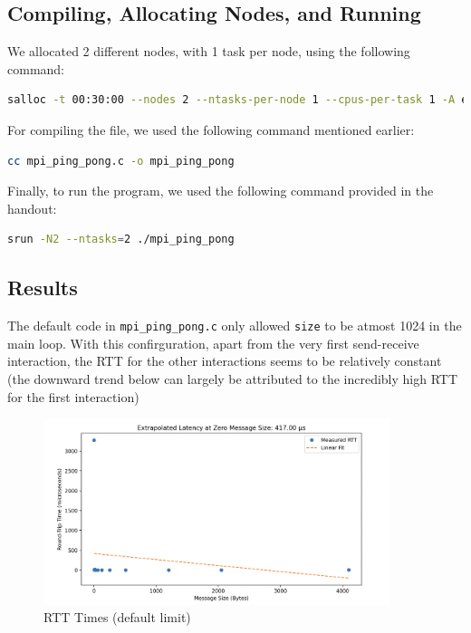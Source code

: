 \documentclass[a4paper,10pt]{article}
\begin{document}
\subsection{Compiling, Allocating Nodes, and Running}
We allocated 2 different nodes, with 1 task per node, using the following command: 
\begin{lstlisting}[language=bash,basicstyle=\tiny\ttfamily]
salloc -t 00:30:00 --nodes 2 --ntasks-per-node 1 --cpus-per-task 1 -A edu25.DD2356 -p shared 
\end{lstlisting}
For compiling the file, we used the following command mentioned earlier: 
\begin{lstlisting}[language=bash,basicstyle=\ttfamily]
cc mpi_ping_pong.c -o mpi_ping_pong
\end{lstlisting}
Finally, to run the program, we used the following command provided in the handout: 
\begin{lstlisting}[language=bash,basicstyle=\ttfamily]
srun -N2 --ntasks=2 ./mpi_ping_pong
\end{lstlisting}

\subsection{Results}
The default code in \verb|mpi_ping_pong.c| only allowed \verb|size| to be atmost 1024 in the main loop. With this confirguration, apart from the very first send-receive interaction, the RTT for the other interactions seems to be relatively constant (the downward trend below can largely be attributed to the incredibly high RTT for the first interaction)

  \begin{figure}[H]
    \centering
    \includegraphics[width=0.9\textwidth]{img/bonus_lim1024}
    \caption{RTT Times (default limit)}
    \label{fig:bonus_rtt_default}
  \end{figure}
  
\end{document}
